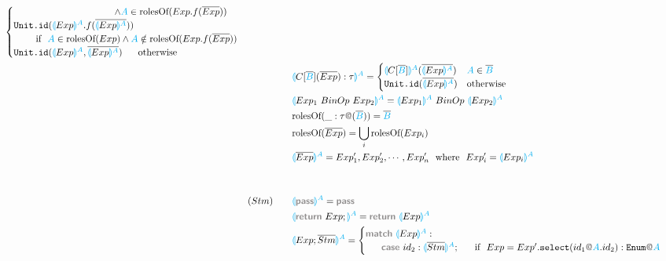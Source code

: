 \documentclass{thesis}
\newcommand{\projection}[2]{{\color{cyan}\llparenthesis}#1{\color{cyan}\rrparenthesis^#2}}
\newcommand{\gray}[1]{\textbf{\textsf{\color{Gray}#1}}}
\newcommand{\cyan}[1]{\color{cyan}#1}
\begin{document}
\begin{alignat*}{2}
\begin{cases}
    ~~~~~~~~~~~~~~~~~~~~~~~~~~~~~~~~ \wedge {\color{cyan}A} \in \text{rolesOf}(Exp.f(\overline{Exp}))\\
    \texttt{Unit.id}(\projection{Exp}{A}.f(\overline{\projection{Exp}{A}})) \\
    ~~~~~~~\text{if}~~ {\color{cyan}A} \in \text{rolesOf}(Exp) \wedge {\color{cyan}A} \notin \text{rolesOf}(Exp.f(\overline{Exp}))\\
    \texttt{Unit.id}(\projection{Exp}{A},\overline{\projection{Exp}{A}}) ~~~~~\text{otherwise}
  \end{cases}\\
  &&&\projection{C[\overline{\color{cyan}B}](\overline{Exp}):\tau}{A}=
  \begin{cases}
    \projection{C[\overline{\color{cyan}B}]}{A} (\overline{\projection{Exp}{A}}) & {\color{cyan}A} \in \overline{\color{cyan}B}\\
    \texttt{Unit.id}(\overline{\projection{Exp}{A}}) &\text{otherwise}
  \end{cases}\\
  &&&\projection{Exp_1 ~BinOp~ Exp_2}{A} = \projection{Exp_1}{A} ~BinOp~ \projection{Exp_2}{A}\\
  &&&\text{rolesOf}(\_:\tau\gray{@}(\overline{\color{cyan}B})) = {\overline{\color{cyan}B}}\\
  &&&\text{rolesOf}(\overline{Exp}) = \bigcup_i \text{rolesOf}(Exp_i) \\
  &&&\projection{\overline{Exp}}{A} = Exp'_1,Exp'_2,\cdots,Exp'_n ~~\text{where}~~ Exp'_i = \projection{Exp_i}{A}\\ 
  \\
  \\ 
  &(Stm)~~~ &&\projection{\gray{pass}}{A} = \gray{pass}\\
  &&&\projection{\gray{return} ~ Exp;}{A} = \gray{return} ~ \projection{Exp}{A}\\
  &&&\projection{Exp;\overline{Stm}}{A} =
  \begin{cases}
    \gray{match} ~\projection{Exp}{A}: \\
    ~~~~~\gray{case} ~id_2: \projection{\overline{Stm}}{A};~~~~~ \text{if}~~Exp = Exp'.\texttt{select}(id_1\gray{@}{\cyan{A}}.id_2):\texttt{Enum}\gray{@}{\cyan{A}}\\ %

\end{cases}
\end{alignat*}
\end{document}
